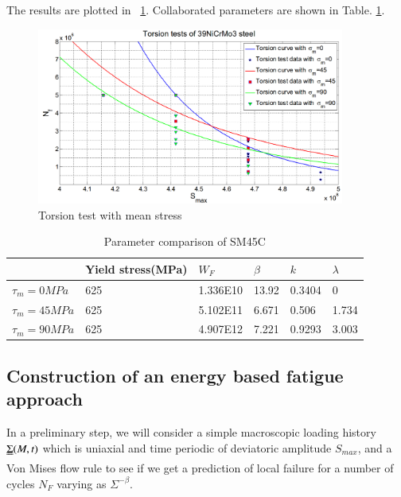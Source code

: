 \documentclass[3p,times,procedia,number]{elsarticle}
\newcommand{\figref}[1]{\figurename~\ref{#1}}
\begin{document}
The results are plotted in \figref{torsionSN}. Collaborated parameters are shown in Table. \ref{mean39NiCrMo3}.
\begin{figure}[h!]
	\centering
	\includegraphics[width=0.9\textwidth]{figures//torsionSN.png} 
	\caption{Torsion test with mean stress}
	\label{torsionSN}
\end{figure}
\begin{table}[]
	\centering
	\caption{Parameter comparison of SM45C}
	\label{mean39NiCrMo3}
	\begin{tabular}{l|lllll}
		\hline
		& \textbf{Yield stress(MPa)} & \textbf{$W_F$}                  & \textbf{$\beta$} & \textbf{$k$} & \textbf{$\lambda$} \\ \hline
		\textbf{$\tau_m=0MPa$}                         & 625                        & 1.336E10                        & 13.92            & 0.3404       & 0                 \\
		{\color[HTML]{333333} \textbf{$\tau_m=45MPa$}} & 625                        & {\color[HTML]{000000} 5.102E11} & 6.671            & 0.506        & 1.734             \\
		{\color[HTML]{333333} \textbf{$\tau_m=90MPa$}} & 625                        & 4.907E12                        & 7.221            & 0.9293       & 3.003             \\ \hline
	\end{tabular}
\end{table}

\subsection{Construction of an energy based fatigue approach}

In a preliminary step, we will consider a simple macroscopic loading history $\uuline{\Sigma}(M, t)$ which is uniaxial
and time periodic of deviatoric amplitude $S_{max}$, and a Von Mises flow rule to see if we get a prediction of local failure for a number of cycles $N_F$ varying as $\Sigma^{-\beta}.$
\end{document}
